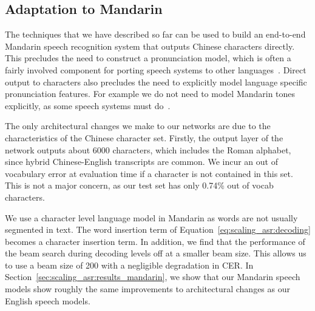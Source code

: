 \subsection{Adaptation to Mandarin}
\label{sec:scaling_asr:chinesemodel}

The techniques that we have described so far can be used to build an end-to-end
Mandarin speech recognition system that outputs Chinese characters directly.
This precludes the need to construct a pronunciation model, which is often a
fairly involved component for porting speech systems to other
languages~\cite{shan2010}. Direct output to characters also precludes the need
to explicitly model language specific pronunciation features. For example we do
not need to model Mandarin tones explicitly, as some speech systems must
do~\cite{shan2010, niu2013}.

The only architectural changes we make to our networks are due to the
characteristics of the Chinese character set. Firstly, the output layer of the
network outputs about 6000 characters, which includes the Roman alphabet, since
hybrid Chinese-English transcripts are common. We incur an out of vocabulary
error at evaluation time if a character is not contained in this set. This is
not a major concern, as our test set has only 0.74\% out of vocab characters.

We use a character level language model in Mandarin as words are not usually
segmented in text. The word insertion term of
Equation~\ref{eq:scaling_asr:decoding} becomes a character insertion term. In
addition, we find that the performance of the beam search during decoding
levels off at a smaller beam size. This allows us to use a beam size of 200
with a negligible degradation in CER. In
Section~\ref{sec:scaling_asr:results_mandarin}, we show that our Mandarin
speech models show roughly the same improvements to architectural changes as
our English speech models.
